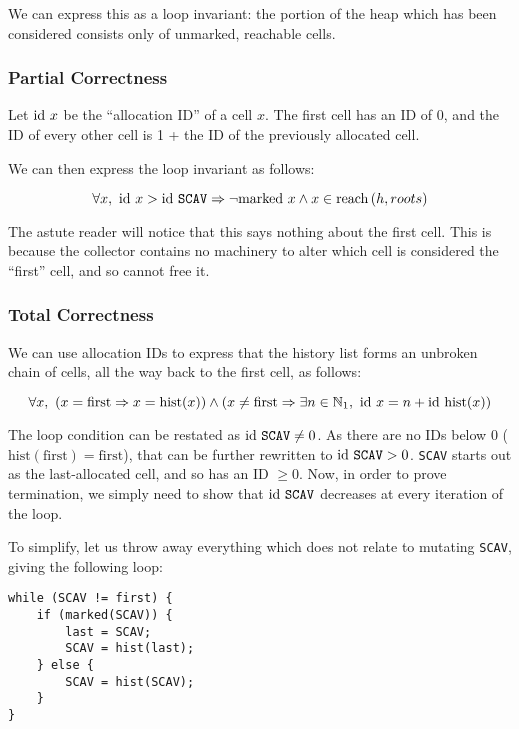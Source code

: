 We can express this as a loop invariant: the portion of the heap which
has been considered consists only of unmarked, reachable cells.

\subsubsection{Partial Correctness}

Let $\mathrm{id}~x$ be the ``allocation ID'' of a cell $x$. The first cell has
an ID of 0, and the ID of every other cell is 1 + the ID of the
previously allocated cell.

We can then express the loop invariant as follows:

\[\forall x,\ \mathrm{id}~x > \mathrm{id}~\mathtt{SCAV} \Rightarrow
\lnot \mathrm{marked}~x \land x \in \mathrm{reach}\left(h, roots\right)\]

The astute reader will notice that this says nothing about the first
cell. This is because the collector contains no machinery to alter
which cell is considered the ``first'' cell, and so cannot free it.


\subsubsection{Total Correctness}

We can use allocation IDs to express that the history list forms an
unbroken chain of cells, all the way back to the first cell, as
follows:

\[\forall x,\ \left(x = \mathrm{first} \Rightarrow x =
  \mathrm{hist}(x)\right) \land \left(x \neq \mathrm{first} \Rightarrow
  \exists n \in \mathbb N_{1},\ \mathrm{id}~x = n + \mathrm{id}~\mathrm{hist}(x)\right)\]

The loop condition can be restated as $\mathrm{id}~\mathtt{SCAV} \neq 0$. As
there are no IDs below 0 ($\mathrm{hist}(\mathrm{first}) =
\mathrm{first}$), that can be further rewritten to $\mathrm{id}~\mathtt{SCAV}
> 0$. \texttt{SCAV} starts out as the last-allocated cell, and so has
an ID $\geq 0$. Now, in order to prove termination, we simply need to
show that $\mathrm{id}~\mathtt{SCAV}$ decreases at every iteration of the
loop.

To simplify, let us throw away everything which does not relate to
mutating \texttt{SCAV}, giving the following loop:

\begin{lstlisting}
while (SCAV != first) {
    if (marked(SCAV)) {
        last = SCAV;
        SCAV = hist(last);
    } else {
        SCAV = hist(SCAV);
    }
}
\end{lstlisting}

